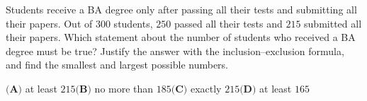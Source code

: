 Students receive a BA degree only after passing all their tests and submitting all their papers. Out of $300$ students, $250$ passed all their tests and $215$ submitted all their papers. Which statement about the number of students who received a BA degree must be true? Justify the answer with the inclusion--exclusion formula, and find the smallest and largest possible numbers.

$\textbf{(A)}$ at least $215$\qquad$\textbf{(B)}$ no more than $185$\qquad$\textbf{(C)}$ exactly $215$\qquad$\textbf{(D)}$ at least $165$
